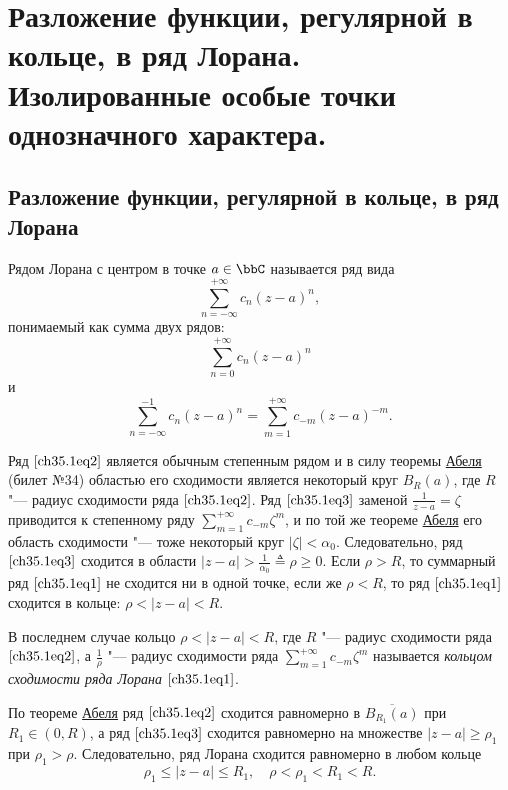 \chapter{Разложение функции, регулярной в кольце, в ряд Лорана. Изолированные особые точки однозначного характера.}

\section{Разложение функции, регулярной в кольце, в ряд Лорана}

\begin{defn}
Рядом Лорана с центром в точке $a \in \bbC$ называется ряд вида
\begin{equation} \label{ch35.1eq1}
\sum\limits_{n = -\infty}^{+\infty} c_n (z - a)^n,
\end{equation}
понимаемый как сумма двух рядов:
\begin{equation} \label{ch35.1eq2}
\sum\limits_{n = 0}^{+\infty} c_n (z - a)^n
\end{equation}
и
\begin{equation} \label{ch35.1eq3}
\sum\limits_{n = -\infty}^{-1} c_n (z - a)^n = \sum\limits_{m = 1}^{+\infty} c_{-m} (z - a)^{-m}.
\end{equation}
\end{defn}


Ряд $\eqref{ch35.1eq2}$ является обычным степенным рядом и в силу теоремы \hyperref[ch34.2Thm1]{Абеля} (билет №34) областью его сходимости является некоторый круг $B_R(a)$, где $R$ "--- радиус сходимости ряда $\eqref{ch35.1eq2}$. Ряд $\eqref{ch35.1eq3}$ заменой $\frac{1}{z - a} = \zeta$ приводится к степенному ряду $\sum\limits_{m = 1}^{+\infty}c_{-m} \zeta^m$, и по той же теореме \hyperref[ch34.2Thm1]{Абеля} его область сходимости "--- тоже некоторый круг $|\zeta| < \alpha_0$. Следовательно, ряд $\eqref{ch35.1eq3}$ сходится в области $|z - a| > \frac{1}{\alpha_0} \triangleq \rho \ge 0$. Если $\rho > R$, то суммарный ряд $\eqref{ch35.1eq1}$ не сходится ни в одной точке, если же $\rho < R$, то ряд $\eqref{ch35.1eq1}$ сходится в кольце: $\rho < |z - a| < R$.

В последнем случае кольцо $\rho < |z - a| < R$, где $R$ "--- радиус сходимости ряда $\eqref{ch35.1eq2}$, а $\frac{1}{\rho}$ "--- радиус сходимости ряда $\sum\limits_{m = 1}^{+\infty} c_{-m} \zeta^m$ называется \textit{кольцом сходимости ряда Лорана} $\eqref{ch35.1eq1}$.

По теореме \hyperref[ch34.2Thm1]{Абеля} ряд $\eqref{ch35.1eq2}$ сходится равномерно в $\overline{B_{R_1}(a)}$ при 
$R_1 \in (0,R)$, а ряд $\eqref{ch35.1eq3}$ сходится равномерно на множестве $|z - a| \ge \rho_1$ при $\rho_1 > \rho$. Следовательно, ряд Лорана сходится равномерно в любом кольце
$$
\rho_1 \le |z - a| \le R_1, \quad \rho < \rho_1 < R_1 < R.
$$

